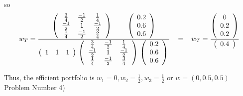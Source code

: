 \documentclass[11pt]{article}
\begin{document}
so\\

\[
w_{T} =
\frac{
\left( \begin{array}{ccc}
\frac{3}{4} & \frac{-1}{2} & \frac{1}{4} \\
\frac{-1}{2} & 1 & \frac{-1}{2} \\
\frac{1}{4} & \frac{-1}{2} & \frac{3}{4} \end{array} \right)
\\
\left( \begin{array}{ccc}
0.2 \\
0.6 \\
0.6 \end{array} \right)
}
{
\left( \begin{array}{ccc}
1 & 1 & 1 \end{array} \right)
\\
\left( \begin{array}{ccc}
\frac{3}{4} & \frac{-1}{2} & \frac{1}{4} \\
\frac{-1}{2} & 1 & \frac{-1}{2} \\
\frac{1}{4} & \frac{-1}{2} & \frac{3}{4} \end{array} \right)
\\
\left( \begin{array}{ccc}
0.2 \\
0.6 \\
0.6 \end{array} \right)
\\
}
\hspace{3mm}
=
\hspace{3mm}
w_{T} =
\frac{
\left( \begin{array}{ccc}
0 \\
0.2 \\
0.2 \end{array} \right)
}
{
\left( \begin{array}{c}
0.4 \end{array} \right)
}
\]

Thus, the efficient portfolio is $w_{1} = 0, w_{2} = \frac{1}{2}, w_{3} = \frac{1}{2}$ or $w = (0, 0.5, 0.5)$\\


Problem Number 4)\\
\end{document}
